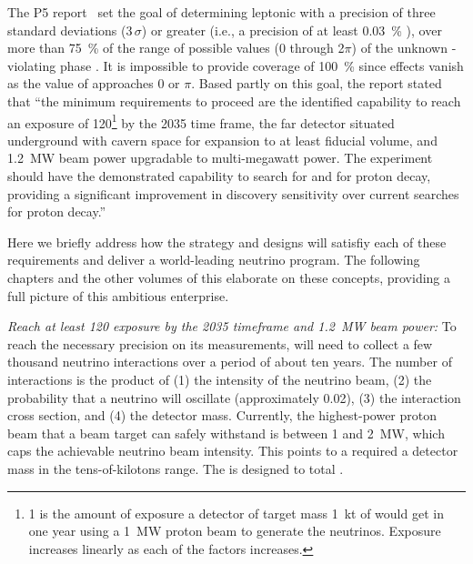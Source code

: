 The P5 report~\cite{p5report} set the goal of 
determining leptonic  with a precision of three standard deviations (\num{3}$\,\sigma$) or greater (i.e., a precision of at least \SI{0.03}{\%} ), over more than \SI{75}{\%}   of the range of possible values  (0 through 2$\pi$) of the unknown -violating phase \deltacp. It is impossible to provide coverage of \SI{100}{\%}  since  effects vanish as the value of \deltacp approaches $0$ or $\pi$. 
 Based partly on this goal, the report stated that ``the 
minimum requirements to proceed are the identified capability to reach an exposure 
of \SI{120}{\ktMWyr}\footnote{\SI{1}{\ktMWyr} is the amount of exposure a detector of target mass \SI{1}{kt} of  would get in one year using a \SI{1}{MW} proton beam to generate the neutrinos. Exposure increases linearly as each of the factors increases.}
 by the 2035 time frame, the far detector situated underground 
with cavern space for expansion to at least \fdfiducialmass {} fiducial volume, and \SI{1.2}{MW} beam power upgradable to multi-megawatt power.
The experiment should have the demonstrated 
capability to search for  and for proton decay, providing a significant 
improvement in discovery sensitivity over current searches for proton decay.'' %


Here we briefly address how the  strategy and designs will satisfiy each of these requirements and deliver a world-leading neutrino program. %
The following chapters and the other volumes of this  elaborate on these concepts, providing a full picture of this ambitious enterprise. 

\textit{Reach at least \SI{120}{\ktMWyr} exposure by the 2035 timeframe and \SI{1.2}{\MW} beam power: } To reach the necessary precision on its measurements,  will need to collect a few thousand neutrino interactions over a period of about ten years. The number of interactions is the product of (1) the intensity of the neutrino beam, (2) the probability that a neutrino will oscillate (approximately \num{0.02}), (3) the interaction cross section, and (4) the detector mass.  Currently, the highest-power proton beam that a beam target can safely withstand is between \num{1} and \SI{2}{\MW}, which caps the achievable neutrino beam intensity. This points to a required a detector mass in the tens-of-kilotons range. The   is designed to total \fdfiducialmass{}.

